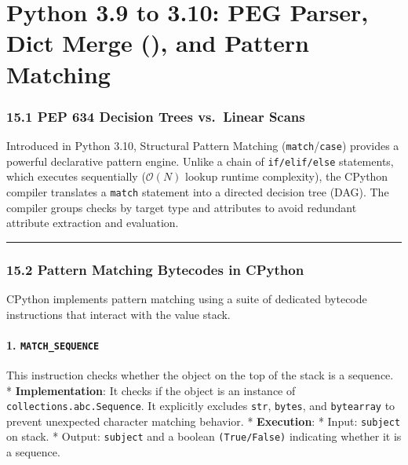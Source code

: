 \hypertarget{python-3.9-to-3.10-peg-parser-dict-merge-and-pattern-matching}{%
\chapter{Python 3.9 to 3.10: PEG Parser, Dict Merge (\textbar), and
Pattern
Matching}\label{python-3.9-to-3.10-peg-parser-dict-merge-and-pattern-matching}}

\hypertarget{pep-634-decision-trees-vs.-linear-scans}{%
\subsection{15.1 PEP 634 Decision Trees vs.~Linear
Scans}\label{pep-634-decision-trees-vs.-linear-scans}}

Introduced in Python 3.10, Structural Pattern Matching
(\passthrough{\lstinline!match!}/\passthrough{\lstinline!case!})
provides a powerful declarative pattern engine. Unlike a chain of
\passthrough{\lstinline!if/elif/else!} statements, which executes
sequentially (\(\mathcal{O}(N)\) lookup runtime complexity), the CPython
compiler translates a \passthrough{\lstinline!match!} statement into a
directed decision tree (DAG). The compiler groups checks by target type
and attributes to avoid redundant attribute extraction and evaluation.

\begin{center}\rule{0.5\linewidth}{0.5pt}\end{center}

\hypertarget{pattern-matching-bytecodes-in-cpython}{%
\subsection{15.2 Pattern Matching Bytecodes in
CPython}\label{pattern-matching-bytecodes-in-cpython}}

CPython implements pattern matching using a suite of dedicated bytecode
instructions that interact with the value stack.

\hypertarget{match_sequence}{%
\subsubsection{\texorpdfstring{1.
\texttt{MATCH\_SEQUENCE}}{1. MATCH\_SEQUENCE}}\label{match_sequence}}

This instruction checks whether the object on the top of the stack is a
sequence. * \textbf{Implementation}: It checks if the object is an
instance of \passthrough{\lstinline!collections.abc.Sequence!}. It
explicitly excludes \passthrough{\lstinline!str!},
\passthrough{\lstinline!bytes!}, and \passthrough{\lstinline!bytearray!}
to prevent unexpected character matching behavior. * \textbf{Execution}:
* Input: \passthrough{\lstinline!subject!} on stack. * Output:
\passthrough{\lstinline!subject!} and a boolean
\passthrough{\lstinline!(True/False)!} indicating whether it is a
sequence.

